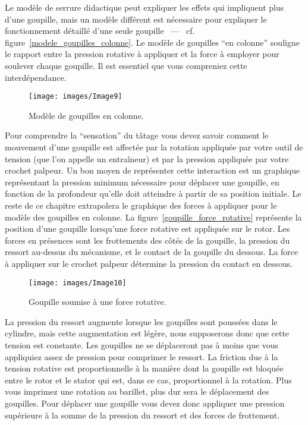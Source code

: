 \documentclass[a4paper,french,11pt,twoside]{report}
\begin{document}
Le modèle de serrure didactique peut expliquer les effets qui impliquent plus d'une goupille, mais un modèle différent est nécessaire pour expliquer le fonctionnement détaillé d'une seule goupille ~---~ cf. figure~\vref{modele_goupilles_colonne}. Le modèle de goupilles \enquote{en colonne} souligne le rapport entre la pression rotative à appliquer et la force à employer pour soulever chaque goupille. Il est essentiel que vous compreniez cette interdépendance.

\begin{figure}[ht]
  \begin{center}
    \texttt{[image: images/Image9]}
    \caption{Modèle de goupilles en colonne.\label{modele_goupilles_colonne}}
  \end{center}
\end{figure}

Pour comprendre la \enquote{sensation} du tâtage vous devez savoir comment le mouvement d'une goupille est affectée par la rotation appliquée par votre outil de tension (que l'on appelle un entraîneur) et par la pression appliquée par votre crochet palpeur. Un bon moyen de représenter cette interaction est un graphique représentant la pression minimum nécessaire pour déplacer une goupille, en fonction de la profondeur qu'elle doit atteindre à partir de sa position initiale. Le reste de ce chapitre extrapolera le graphique des forces à appliquer pour le modèle des goupilles en colonne. La figure~\vref{goupille_force_rotative} représente la position d'une goupille lorsqu'une force rotative est appliquée sur le rotor. Les forces en présences sont les frottements des côtés de la goupille, la pression du ressort au-dessus du mécanisme, et le contact de la goupille du dessous. La force à appliquer sur le crochet palpeur détermine la pression du contact en dessous.

\begin{figure}[ht]
  \begin{center}
    \texttt{[image: images/Image10]}
    \caption{Goupille soumise à une force rotative.\label{goupille_force_rotative}}
  \end{center}
\end{figure}

La pression du ressort augmente lorsque les goupilles sont poussées dans le cylindre, mais cette augmentation est légère, nous supposerons donc que cette tension est constante. Les goupilles ne se déplaceront pas à moins que vous appliquiez assez de pression pour comprimer le ressort. La friction due à la tension rotative est proportionnelle à la manière dont la goupille est bloquée entre le rotor et le stator qui est, dans ce cas, proportionnel à la rotation. Plus vous imprimez une rotation au barillet, plus dur sera le déplacement des goupilles. Pour déplacer une goupille vous devez donc appliquer une pression supérieure à la somme de la pression du ressort et des forces de frottement.
\end{document}
